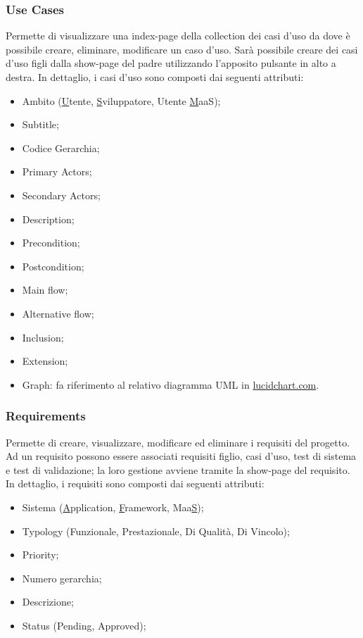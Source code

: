      
     \subsubsection{Use Cases}
     Permette di visualizzare una index-page della collection dei casi d'uso da dove è possibile creare, eliminare, modificare un caso d'uso. Sarà possibile creare dei casi d'uso figli dalla show-page del padre utilizzando l'apposito pulsante in alto a destra.
     In dettaglio, i casi d'uso sono composti dai seguenti attributi:
     \begin{itemize}
     	\item Ambito (\underline{U}tente, \underline{S}viluppatore, Utente \underline{M}aaS);
     	\item Subtitle;
     	\item Codice Gerarchia;
     	\item Primary Actors;
     	\item Secondary Actors;
     	\item Description;
     	\item Precondition;
     	\item Postcondition;
     	\item Main flow;
     	\item Alternative flow;
     	\item Inclusion;
     	\item Extension;
     	\item Graph: fa riferimento al relativo diagramma UML in \url{lucidchart.com}.
     \end{itemize}
     
     \subsubsection{Requirements}
     Permette di creare, visualizzare, modificare ed eliminare i requisiti del progetto. Ad un requisito possono essere associati requisiti figlio, casi d'uso, test di sistema e test di validazione; la loro gestione avviene tramite la show-page del requisito.
     In dettaglio, i requisiti sono composti dai seguenti attributi:
     \begin{itemize}
     	\item Sistema (\underline{A}pplication, \underline{F}ramework, Maa\underline{S});
     	\item Typology (Funzionale, Prestazionale, Di Qualità, Di Vincolo);
     	\item Priority;
     	\item Numero gerarchia;
     	\item Descrizione;
     	\item Status (Pending, Approved);
     \end{itemize}
     
